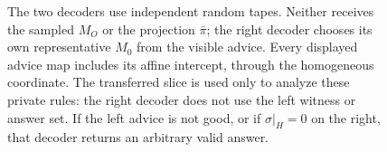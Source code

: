 \begin{figure}[tbp]
\caption{The two decoders use independent random tapes. Neither receives the
sampled $M_O$ or the projection $\bar\pi$; the right decoder chooses its own
representative $M_0$ from the visible advice. Every displayed advice map
includes its affine intercept, through the homogeneous coordinate. The
transferred slice is used only to analyze these private rules: the right
decoder does not use the left witness or answer set. If the left advice is
not good, or if $\sigma|_H=0$ on the right, that decoder returns an arbitrary
valid answer.}
\label{fig:advice}
\end{figure}
